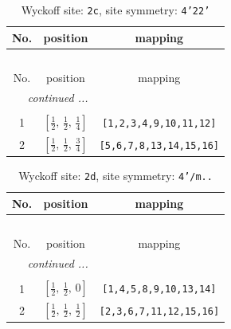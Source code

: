 \documentclass[fleqn,8pt]{jsarticle}
\begin{document}
\renewcommand{\arraystretch}{1.2}
\begin{longtable}{ccc}
\caption{Wyckoff site: {\tt 2c}, site symmetry: {\tt 4'22'}}
 \\
 \hline \hline
No. & position & mapping \\ \hline \endfirsthead

\multicolumn{2}{l}{\tablename\ \thetable{}} \\
 \hline \hline
No. & position & mapping \\ \hline \endhead

 \hline \hline
\multicolumn{2}{r}{\footnotesize\it continued ...} \\ \endfoot

 \hline \hline
\multicolumn{2}{r}{} \\ \endlastfoot

1 & $\left[ \frac{1}{2},\, \frac{1}{2},\, \frac{1}{4} \right]$ & {\tt [1,2,3,4,9,10,11,12]} \\ \hline
2 & $\left[ \frac{1}{2},\, \frac{1}{2},\, \frac{3}{4} \right]$ & {\tt [5,6,7,8,13,14,15,16]} \\
\end{longtable}
\renewcommand{\arraystretch}{1.2}
\begin{longtable}{ccc}
\caption{Wyckoff site: {\tt 2d}, site symmetry: {\tt 4'/m..}}
 \\
 \hline \hline
No. & position & mapping \\ \hline \endfirsthead

\multicolumn{2}{l}{\tablename\ \thetable{}} \\
 \hline \hline
No. & position & mapping \\ \hline \endhead

 \hline \hline
\multicolumn{2}{r}{\footnotesize\it continued ...} \\ \endfoot

 \hline \hline
\multicolumn{2}{r}{} \\ \endlastfoot

1 & $\left[ \frac{1}{2},\, \frac{1}{2},\, 0 \right]$ & {\tt [1,4,5,8,9,10,13,14]} \\ \hline
2 & $\left[ \frac{1}{2},\, \frac{1}{2},\, \frac{1}{2} \right]$ & {\tt [2,3,6,7,11,12,15,16]} \\
\end{longtable}
\renewcommand{\arraystretch}{1.2}
\end{document}
